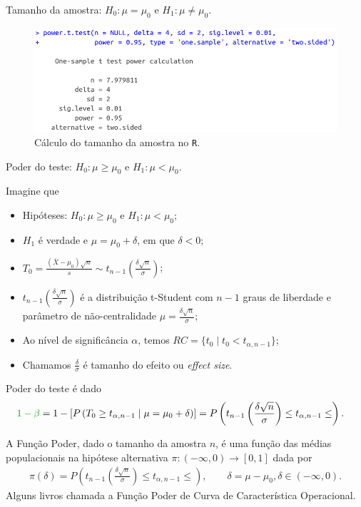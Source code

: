 \documentclass[8pt]{beamer}
\begin{document}
\begin{frame}{Tamanho da amostra: $H_0:\mu = \mu_0$ e $H_1: \mu \neq \mu_0$.}

\begin{figure}[htbp]
	\centering
	\caption{Cálculo do tamanho da amostra no \texttt{R}.}
	\includegraphics[width=0.9\linewidth]{figures/t-noncentral-sample-size-R.png}
\end{figure}

\end{frame}

\begin{frame}{Poder do teste: $H_0:\mu \geq \mu_0$ e $H_1: \mu < \mu_0$.}

\normalsize

Imagine que
\begin{itemize}
	\item Hipóteses: $H_0: \mu \geq \mu_0$ e $H_1: \mu < \mu_0$;
	\item $H_1$ é verdade e $\mu = \mu_0 + \delta$, em que $\delta < 0$;
	\item $T_0 = \frac{(\bar{X} - \mu_0)\sqrt{n}}{s}  \sim t_{n-1}\left( \frac{\delta \sqrt{n}}{\sigma} \right)$;
	\item $t_{n-1}\left(\frac{\delta\sqrt{n}}{\sigma}\right)$ é  a distribuição t-Student com $n-1$ graus de liberdade e parâmetro de não-centralidade $\mu = \frac{\delta \sqrt{n}}{\sigma}$;
	\item Ao nível de significância $\alpha$, temos $RC = \{ t_0 \mid t_0 < t_{\alpha, n-1}   \}$;
	\item Chamamos $\frac{\delta}{\sigma}$ é tamanho do efeito ou \textit{effect size}.
\end{itemize}
\vfill	

Poder do teste é dado
\begin{align*}
\textcolor{important}{1-\beta} &=1 - \left[P\left( T_0 \geq t_{\alpha, n-1} \mid \mu = \mu_0 + \delta \right)\right]  = P\left( t_{n-1}\left( \frac{\delta\sqrt{n}}{\sigma} \right) \leq t_{\alpha, n-1} \leq \right).
\end{align*}
\vfill

A \textcolor{important}{Função Poder}, dado o tamanho da amostra $n$, é uma função das médias populacionais na hipótese alternativa  $\pi: (-\infty, 0) \longrightarrow [0,1]$ dada por
\begin{align*}
\pi(\delta) =  P\left( t_{n-1}\left( \frac{\delta\sqrt{n}}{\sigma} \right) \leq t_{\alpha, n-1} \leq \right),\qquad \delta = \mu - \mu_0, \delta \in (-\infty, 0).
\end{align*}
Alguns livros chamada a Função Poder de \textcolor{important}{Curva de Característica Operacional.}

\normalsize	

\end{frame}
\end{document}
